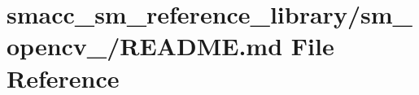 \hypertarget{smacc__sm__reference__library_2sm__opencv__2_2README_8md}{}\section{smacc\+\_\+sm\+\_\+reference\+\_\+library/sm\+\_\+opencv\+\_/\+R\+E\+A\+D\+ME.md File Reference}
\label{smacc__sm__reference__library_2sm__opencv__2_2README_8md}
